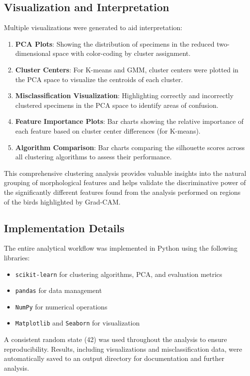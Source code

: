 \documentclass[a4paper,12pt]{report}
\begin{document}
\subsection{Visualization and Interpretation}
Multiple visualizations were generated to aid interpretation:
\begin{enumerate}
    \item \textbf{PCA Plots}: Showing the distribution of specimens in the reduced two-dimensional space with color-coding by cluster assignment.
    \item \textbf{Cluster Centers}: For K-means and GMM, cluster centers were plotted in the PCA space to visualize the centroids of each cluster.
    \item \textbf{Misclassification Visualization}: Highlighting correctly and incorrectly clustered specimens in the PCA space to identify areas of confusion.
    \item \textbf{Feature Importance Plots}: Bar charts showing the relative importance of each feature based on cluster center differences (for K-means).
    \item \textbf{Algorithm Comparison}: Bar charts comparing the silhouette scores across all clustering algorithms to assess their performance.
\end{enumerate}
This comprehensive clustering analysis provides valuable insights into the natural grouping of morphological features and helps validate the discriminative power of the significantly different features found from the analysis performed on regions of the birds highlighted by Grad-CAM. 

\subsection{Implementation Details}

The entire analytical workflow was implemented in Python using the following libraries:

\begin{itemize}
    \item \texttt{scikit-learn} for clustering algorithms, PCA, and evaluation metrics
    \item \texttt{pandas} for data management
    \item \texttt{NumPy} for numerical operations
    \item \texttt{Matplotlib} and \texttt{Seaborn} for visualization
\end{itemize}
A consistent random state (42) was used throughout the analysis to ensure reproducibility. Results, including visualizations and misclassification data, were automatically saved to an output directory for documentation and further analysis.
\end{document}
